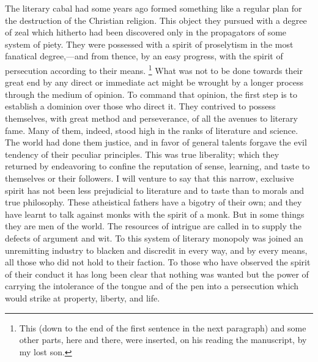 The literary cabal had some years ago formed something like a regular plan for the destruction of the Christian religion. This object they pursued with a degree of zeal which hitherto had been discovered only in the propagators of some system of piety. They were possessed with a spirit of proselytism in the most fanatical degree,—and from thence, by an easy progress, with the spirit of persecution according to their means.
\footnote{ This (down to the end of the first sentence in the next paragraph) and some other parts, here and there, were inserted, on his reading the manuscript, by my lost son.}
 What was not to be done towards their great end by any direct or immediate act might be wrought by a longer process through the medium of opinion. To command that opinion, the first step is to establish a dominion over those who direct it. They contrived to possess themselves, with great method and perseverance, of all the avenues to literary fame. Many of them, indeed, stood high in the ranks of literature and science. The world had done them justice, and in favor of general talents forgave the evil tendency of their peculiar principles. This was true liberality; which they returned by endeavoring to confine the reputation of sense, learning, and taste to themselves or their followers. I will venture to say that this narrow, exclusive spirit has not been less prejudicial to literature and to taste than to morals and true philosophy. These atheistical fathers have a bigotry of their own; and they have learnt to talk against monks with the spirit of a monk. But in some things they are men of the world. The resources of intrigue are called in to supply the defects of argument and wit. To this system of literary monopoly was joined an unremitting industry to blacken and discredit in every way, and by every means, all those who did not hold to their faction. To those who have observed the spirit of their conduct it has long been clear that nothing was wanted but the power of carrying the intolerance of the tongue and of the pen into a persecution which would strike at property, liberty, and life.

